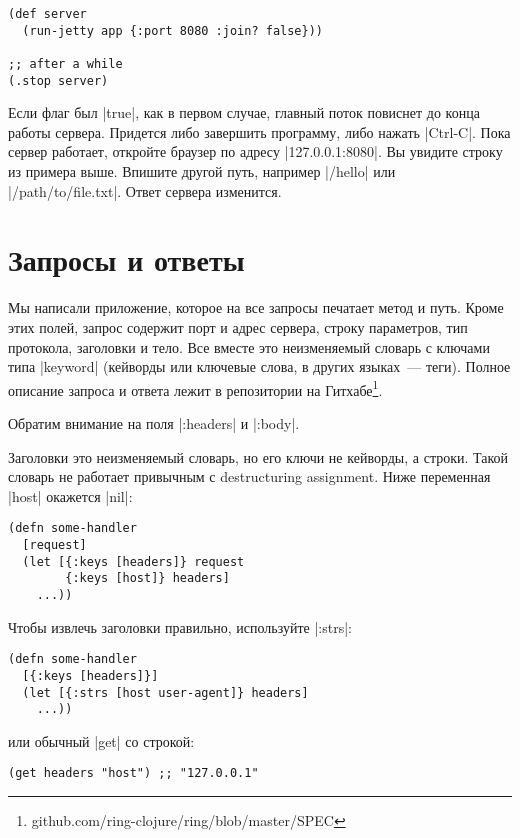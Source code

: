 \begin{verbatim}
(def server
  (run-jetty app {:port 8080 :join? false}))

;; after a while
(.stop server)
\end{verbatim}

Если флаг был \spverb|true|, как в первом случае, главный поток повиснет до
конца работы сервера. Придется либо завершить программу, либо нажать
\spverb|Ctrl-C|. Пока сервер работает, откройте браузер по адресу \spverb|127.0.0.1:8080|.
Вы увидите строку из примера выше. Впишите другой путь, например \spverb|/hello| или
\spverb|/path/to/file.txt|. Ответ сервера изменится.

\section{Запросы и ответы}

Мы написали приложение, которое на все запросы печатает метод и путь. Кроме этих
полей, запрос содержит порт и адрес сервера, строку параметров, тип протокола,
заголовки и тело. Все вместе это неизменяемый словарь с ключами типа
\spverb|keyword| (кейворды или ключевые слова, в других языках~--- теги). Полное
описание запроса и ответа лежит в репозитории
на Гитхабе\footnote{github.com/ring-clojure/ring/blob/master/SPEC}.

Обратим внимание на поля \spverb|:headers| и \spverb|:body|.

Заголовки это неизменяемый словарь, но его ключи не кейворды, а строки. Такой
словарь не работает привычным с destructuring assignment. Ниже переменная \spverb|host|
окажется \spverb|nil|:

\begin{verbatim}
(defn some-handler
  [request]
  (let [{:keys [headers]} request
        {:keys [host]} headers]
    ...))
\end{verbatim}

Чтобы извлечь заголовки правильно, используйте \spverb|:strs|:

\begin{verbatim}
(defn some-handler
  [{:keys [headers]}]
  (let [{:strs [host user-agent]} headers]
    ...))
\end{verbatim}

\noindent
или обычный \spverb|get| со строкой:

\begin{verbatim}
(get headers "host") ;; "127.0.0.1"
\end{verbatim}

